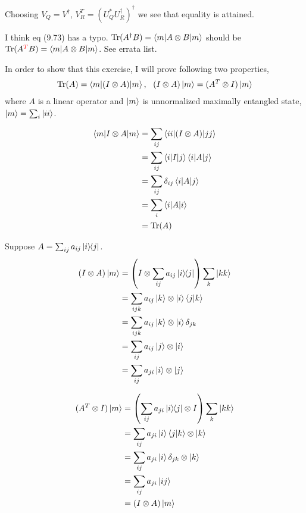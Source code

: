 Choosing $V_Q = V^\dagger$, $V_R^T = (U_Q^* U_R^\dagger)^\dagger$ we see that equality is attained.


I think eq (9.73) has a typo. $\operatorname{Tr} (A^\dagger B) = \braket{m | A \otimes B | m}$ should be $\operatorname{Tr} (A^{\textcolor{red}{T}} B) = \braket{m | A \otimes B | m}$. See errata list.

In order to show that this exercise, I will prove following two properties,
\begin{align*}
    \operatorname{Tr}(A) = \braket{m | (I \otimes A) | m}, ~~ (I \otimes A)\ket{ m} = (A^T \otimes I)\ket{m}
\end{align*}
where $A$ is a linear operator and $\ket{m}$ is unnormalized maximally entangled state, $\ket{m} = \sum_i \ket{ii}$.

\begin{align*}
    \braket{m |I \otimes A| m} &= \sum_{ij} \braket{ii | (I \otimes A) | jj}\\
        &= \sum_{ij} \braket{i | I | j} \braket{i | A | j}\\
        &= \sum_{ij} \delta_{ij} \braket{i | A | j}\\
        &= \sum_i \braket{i | A | i}\\
        &= \operatorname{Tr} (A)
\end{align*}

Suppose $A = \sum_{ij} a_{ij} \ket{i}\hspace{-1mm} \bra{j}$.
\begin{align*}
     (I \otimes A)\ket{ m} &= \left(I \otimes  \sum_{ij} a_{ij} \ket{i}\hspace{-1mm} \bra{j}\right) \sum_k \ket{kk}\\
        &= \sum_{ijk} a_{ij} \ket{k} \otimes \ket{i} \braket{j | k}\\
        &= \sum_{ijk} a_{ij} \ket{k} \otimes \ket{i} \delta_{jk}\\
        &= \sum_{ij} a_{ij} \ket{j} \otimes \ket{i}\\
        &= \sum_{ij} a_{ji} \ket{i} \otimes \ket{j}
\end{align*}

\begin{align*}
    (A^T \otimes I) \ket{m} &= \left(\sum_{ij} a_{ji} \ket{i}\hspace{-1mm} \bra{j} \otimes I\right) \sum_k \ket{kk}\\
        &= \sum_{ij} a_{ji} \ket{i} \braket{j | k} \otimes \ket{k}\\
        &= \sum_{ij} a_{ji} \ket{i} \delta_{jk} \otimes \ket{k}\\
        &= \sum_{ij} a_{ji} \ket{ij}\\
        &= (I \otimes A)\ket{ m }
\end{align*}

